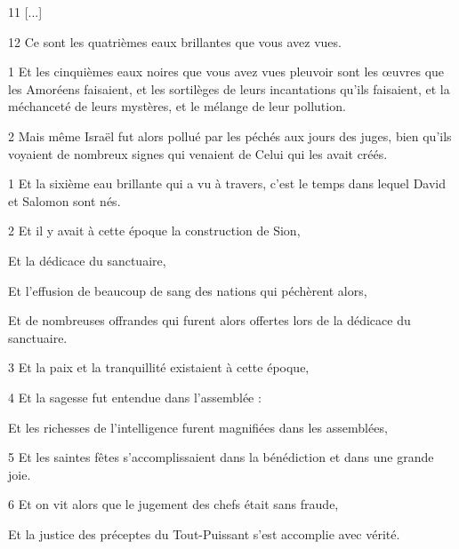 \par 11 [...]

\par 12 Ce sont les quatrièmes eaux brillantes que vous avez vues.


\par 1 Et les cinquièmes eaux noires que vous avez vues pleuvoir sont les œuvres que les Amoréens faisaient, et les sortilèges de leurs incantations qu'ils faisaient, et la méchanceté de leurs mystères, et le mélange de leur pollution.

\par 2 Mais même Israël fut alors pollué par les péchés aux jours des juges, bien qu'ils voyaient de nombreux signes qui venaient de Celui qui les avait créés.


\par 1 Et la sixième eau brillante qui a vu à travers, c'est le temps dans lequel David et Salomon sont nés.

\par 2 Et il y avait à cette époque la construction de Sion,

\par Et la dédicace du sanctuaire,

\par Et l'effusion de beaucoup de sang des nations qui péchèrent alors,

\par Et de nombreuses offrandes qui furent alors offertes lors de la dédicace du sanctuaire.

\par 3 Et la paix et la tranquillité existaient à cette époque,

\par 4 Et la sagesse fut entendue dans l'assemblée :

\par Et les richesses de l'intelligence furent magnifiées dans les assemblées,

\par 5 Et les saintes fêtes s'accomplissaient dans la bénédiction et dans une grande joie.

\par 6 Et on vit alors que le jugement des chefs était sans fraude,

\par Et la justice des préceptes du Tout-Puissant s'est accomplie avec vérité.

